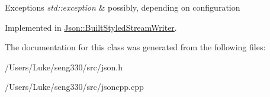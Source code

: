 \begin{DoxyExceptions}{Exceptions}
{\em std\+::exception} & possibly, depending on configuration \\
\hline
\end{DoxyExceptions}


Implemented in \hyperlink{struct_json_1_1_built_styled_stream_writer_a2ecffc3d66c4feddf208e5cd3b1c0f18}{Json\+::\+Built\+Styled\+Stream\+Writer}.



The documentation for this class was generated from the following files\+:\begin{DoxyCompactItemize}
\item 
/\+Users/\+Luke/seng330/src/json.\+h\item 
/\+Users/\+Luke/seng330/src/jsoncpp.\+cpp\end{DoxyCompactItemize}
